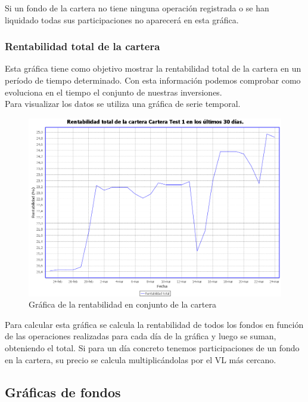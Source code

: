 \documentclass[12pt, a4paper]{book}
\begin{document}
Si un fondo de la cartera no tiene ninguna operación registrada o se han liquidado todas sus participaciones no aparecerá en esta gráfica.

\newpage

\subsubsection{Rentabilidad total de la cartera}

Esta gráfica tiene como objetivo mostrar la rentabilidad total de la cartera en un período de tiempo determinado. Con esta información podemos comprobar como evoluciona en el tiempo el conjunto de nuestras inversiones.\\

Para visualizar los datos se utiliza una gráfica de serie temporal.

	\begin{figure}[htbp]
	\centering
	\includegraphics[width=\textwidth]{figuras/renttotal.PNG}
	\caption{Gráfica de la rentabilidad en conjunto de la cartera}
	\label{fig:renttotal}
	\end {figure}


Para calcular esta gráfica se calcula la rentabilidad de todos los fondos en función de las operaciones realizadas para cada día de la gráfica y luego se suman, obteniendo el total. Si para un día concreto tenemos participaciones de un fondo en la cartera, su precio se calcula multiplicándolas por el \gls{VL} más cercano.
\newpage

\subsection{Gráficas de fondos}
\end{document}
